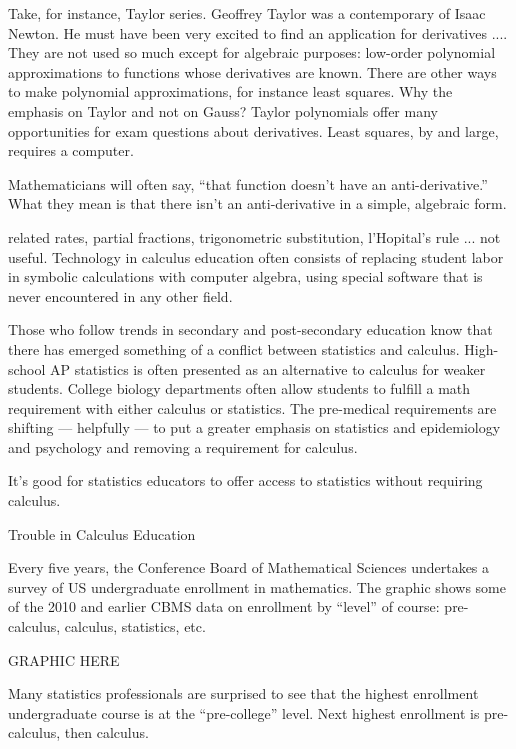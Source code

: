 Take, for instance, Taylor series.  Geoffrey Taylor was a contemporary of Isaac Newton.   He must have been very excited to find an application for derivatives ....  They are not used so much except for algebraic purposes: low-order polynomial approximations to functions whose derivatives are known.  There are other ways to make polynomial approximations, for instance least squares.   Why the emphasis on Taylor and not on Gauss?  Taylor polynomials offer many opportunities for exam questions about derivatives.  Least squares, by and large, requires a computer.

Mathematicians will often say, ``that function doesn't have an anti-derivative.''  What they mean is that there isn't an anti-derivative in a simple, algebraic form.



related rates, partial fractions, trigonometric substitution, l'Hopital's rule ... not useful.  Technology in calculus education often consists of replacing student labor in symbolic calculations with computer algebra, using special software that is never encountered in any other field.



Those who follow trends in secondary and post-secondary education know that there has emerged something of a conflict between statistics and calculus.  High-school AP statistics is often presented as an alternative to calculus for weaker students.  College biology departments often allow students to fulfill a math requirement with either calculus or statistics.  The pre-medical requirements are shifting --- helpfully --- to put a greater emphasis on statistics and epidemiology and psychology and removing a requirement for calculus.

It's good for statistics educators to offer access to statistics without requiring calculus.  


Trouble in Calculus Education 

Every five years, the Conference Board of Mathematical Sciences undertakes a survey of US undergraduate enrollment in mathematics.  The graphic shows some of the 2010 and earlier CBMS data on enrollment by ``level'' of course: pre-calculus, calculus, statistics, etc.

GRAPHIC HERE

Many statistics professionals are surprised to see that the highest enrollment undergraduate course is at the ``pre-college'' level.   Next highest enrollment is pre-calculus, then calculus.  


